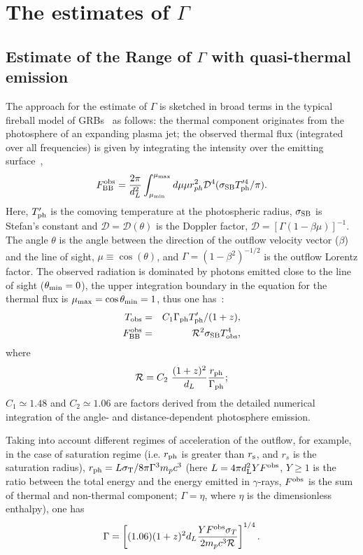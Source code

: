 \documentclass[prd,twocolumn,amsmath,amssymb,aps,linenumbers]{revtex4-2} %
\newcommand{\D}{{\mathcal {D}}}
\newcommand{\R}{{\mathcal {R}}}
\begin{document}
\section{The estimates of $\Gamma$} \label{sec: estiGamma}

\subsection{Estimate of the Range of $\Gamma$ with quasi-thermal emission}
The approach for the estimate of $\Gamma$ is sketched in broad terms in the typical fireball model of GRBs~\citep[e.g.][]{1986ApJ...308L..47G,1986ApJ...308L..43P} as follows: the thermal component originates from the photosphere of an
expanding plasma jet; the observed thermal flux (integrated over
all frequencies) is given by integrating the intensity over the
emitting surface~\citep{2007ApJ...664L...1P},
\begin{equation}\label{eq:Fobs_BB}
  F^{\rm obs}_{\rm BB} = \frac{2\pi}{d_L^2} \int^{\mu_{\rm max}}_{\mu_{\rm min}} d\mu \mu
r_{ph}^2 \D^4 (\sigma_{\rm SB} T'^4_{\rm ph} / \pi).  
\end{equation}
 Here, $T'_{\rm ph}$ is the comoving
temperature at the photospheric radius, $\sigma_{\rm SB}$ is Stefan's
constant and $\D = \D(\theta)$ is the Doppler factor, $\D =
[\Gamma(1-\beta \mu)]^{-1}$. The angle $\theta$ is the angle
between the direction of the outflow velocity vector ($\beta$) and
the line of sight, $\mu \equiv \cos(\theta)$, and $\Gamma = (1-
\beta^2)^{-1/2}$ is the outflow Lorentz factor.  
The observed radiation is dominated by photons
emitted close to the line of sight ($\theta_{\rm min}=0$), the upper integration
boundary in the equation for the thermal flux is $\mu_{\rm max}=\cos \theta_{\rm min}=1$, thus one has~\citep{2007ApJ...664L...1P, 2015ApJ...801..103G}:
\begin{eqnarray}
T_{\rm obs}& = & C_1\Gamma_{\rm ph} T'_{\rm ph} /(1+z),\\
F^{\rm obs}_{\rm BB} & = & \mathcal{R}^2\sigma_{\rm SB} T_{\rm obs}^4,
\end{eqnarray}
where
\begin{eqnarray}
\mathcal{R}=C_2~\frac{(1+z)^2}{d_L}\frac{r_{\rm ph}}{\Gamma_{\rm ph}};
\end{eqnarray}
 $C_1 \simeq 1.48$ and $C_2 \simeq 1.06$ are factors derived from the detailed numerical integration of the angle- and distance-dependent photosphere emission. 


Taking into account different regimes of acceleration of the outflow, for example, in the case of saturation regime (i.e. $r_{\rm ph}$ is greater than $r_{\rm s}$, and $r_s$ is the saturation radius), $r_{\rm ph}=L\sigma_{\rm T}/8\pi \Gamma^3 m_p c^3$ (here $L=4\pi d^2_{\rm L }Y F^{\rm obs}$, $Y\geq 1$ is the ratio between the total energy and the energy emitted in $\gamma$-rays, $F^{\rm obs}$ is the sum of thermal and non-thermal component; $\Gamma=\eta$, where $\eta$ is the dimensionless enthalpy), one has
\begin{equation}
    \Gamma = \left[(1.06) { (1+z)^2 d_L} {Y F^{\rm obs} \sigma_T \over 2 m_p
    c^3 \R} \right]^{1/4}.
\label{eq:eta}
\end{equation}
 
\end{document}
